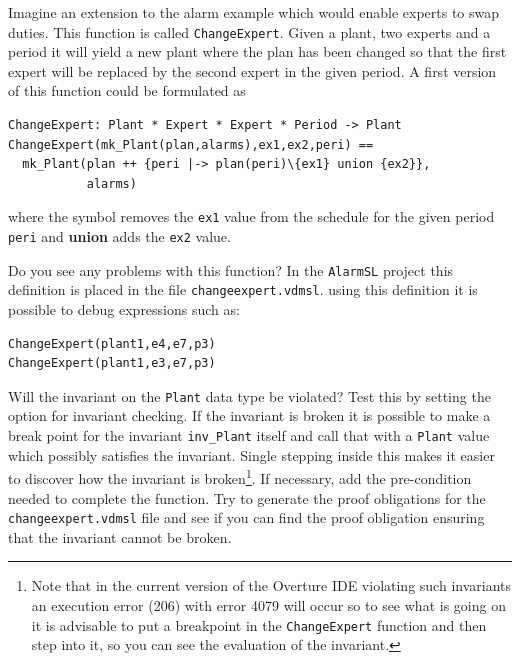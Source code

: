 \begin{myhardexercise}
\label{ex:tool-alarm} Imagine an extension to the alarm example which
would enable experts to swap duties. This function is called
\texttt{ChangeExpert}. Given a plant, two experts and a period it will
yield a new plant where the plan has been changed so that the first
expert will be replaced by the second expert in the given period. A
first version of this function could be formulated as
\begin{lstlisting}
ChangeExpert: Plant * Expert * Expert * Period -> Plant
ChangeExpert(mk_Plant(plan,alarms),ex1,ex2,peri) ==
  mk_Plant(plan ++ {peri |-> plan(peri)\{ex1} union {ex2}},
           alarms)
\end{lstlisting}
\noindent where the \texttt{\SETDIFF} symbol removes the \texttt{ex1}
value from the schedule for the given period \texttt{peri} and
{\bf\ttfamily union} adds the \texttt{ex2} value.

Do you see any problems with this function? In the \texttt{AlarmSL}
project this definition is placed
in the file \texttt{changeexpert.vdmsl}.
using this definition it is possible to debug expressions such as:
\begin{lstlisting}
ChangeExpert(plant1,e4,e7,p3)
ChangeExpert(plant1,e3,e7,p3)
\end{lstlisting}
Will the invariant on the \texttt{Plant} data type be violated?  Test
this by setting the option for invariant checking. If the invariant is
broken it is possible to make a break point for the invariant
\texttt{inv\_Plant} itself and call that with a \texttt{Plant} value
which possibly satisfies the invariant. Single stepping inside this
makes it easier to discover how the invariant is broken\footnote{Note
  that in the current version of the Overture IDE violating such
  invariants an execution error (206) with error 4079 will occur so to
  see what is going on it is advisable to put a breakpoint in the
  \texttt{ChangeExpert} function and then step into it, so you can see
  the evaluation of the invariant.}.  If necessary, add the
pre-condition needed to complete the function. Try to generate the
proof obligations for the \texttt{changeexpert.vdmsl} file and see if
you can find the proof obligation ensuring that the invariant cannot
be broken.
\end{myhardexercise}

